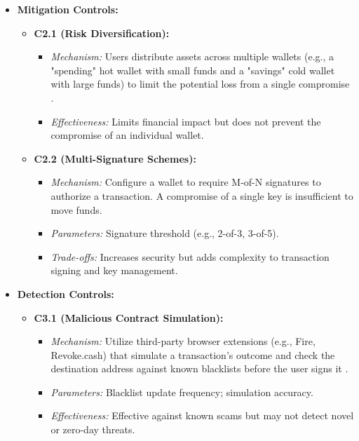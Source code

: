 \begin{itemize}
    \item \textbf{Mitigation Controls:}
    \begin{itemize}
        \item \textbf{C2.1 (Risk Diversification):}
            \begin{itemize}
                \item \textit{Mechanism:} Users distribute assets across multiple wallets (e.g., a "spending" hot wallet with small funds and a "savings" cold wallet with large funds) to limit the potential loss from a single compromise \cite{yu2024}.
                \item \textit{Effectiveness:} Limits financial impact but does not prevent the compromise of an individual wallet.
            \end{itemize}
        \item \textbf{C2.2 (Multi-Signature Schemes):}
            \begin{itemize}
                \item \textit{Mechanism:} Configure a wallet to require M-of-N signatures to authorize a transaction. A compromise of a single key is insufficient to move funds\cite{bitz2018multi}.
                \item \textit{Parameters:} Signature threshold (e.g., 2-of-3, 3-of-5).
                \item \textit{Trade-offs:} Increases security but adds complexity to transaction signing and key management.
            \end{itemize}
    \end{itemize}

    \item \textbf{Detection Controls:}
    \begin{itemize}
        \item \textbf{C3.1 (Malicious Contract Simulation):}
            \begin{itemize}
                \item \textit{Mechanism:} Utilize third-party browser extensions (e.g., Fire, Revoke.cash) that simulate a transaction's outcome and check the destination address against known blacklists before the user signs it \cite{yu2024}.
                \item \textit{Parameters:} Blacklist update frequency; simulation accuracy.
                \item \textit{Effectiveness:} Effective against known scams but may not detect novel or zero-day threats.
            \end{itemize}
    \end{itemize}
\end{itemize}

